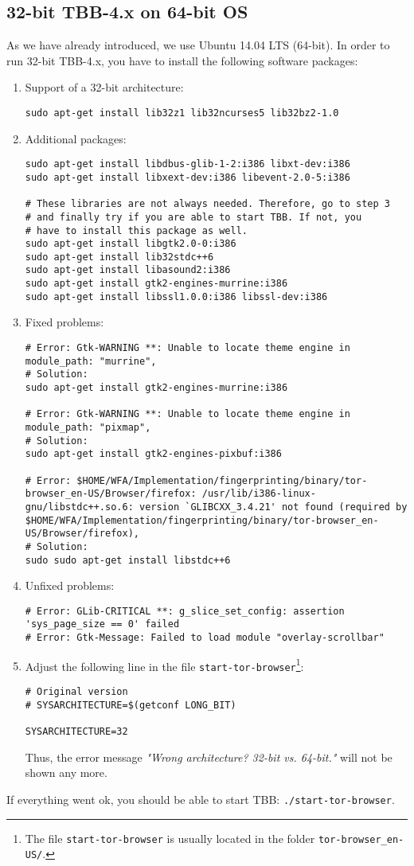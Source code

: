 \subsection{32-bit \ac{TBB}-4.x on 64-bit \ac{OS}}
\label{subsec:tbb_patch}

As we have already introduced, we use Ubuntu 14.04 LTS (64-bit). In order to run 32-bit \ac{TBB}-4.x, you have to install the following software packages:
\begin{enumerate}
\item Support of a 32-bit architecture:
\begin{verbatim}sudo apt-get install lib32z1 lib32ncurses5 lib32bz2-1.0\end{verbatim}
\item Additional packages:
\begin{verbatim}
sudo apt-get install libdbus-glib-1-2:i386 libxt-dev:i386
sudo apt-get install libxext-dev:i386 libevent-2.0-5:i386

# These libraries are not always needed. Therefore, go to step 3
# and finally try if you are able to start TBB. If not, you 
# have to install this package as well.
sudo apt-get install libgtk2.0-0:i386
sudo apt-get install lib32stdc++6
sudo apt-get install libasound2:i386
sudo apt-get install gtk2-engines-murrine:i386
sudo apt-get install libssl1.0.0:i386 libssl-dev:i386
\end{verbatim}
\item Fixed problems:
\begin{verbatim}
# Error: Gtk-WARNING **: Unable to locate theme engine in module_path: "murrine",
# Solution:
sudo apt-get install gtk2-engines-murrine:i386

# Error: Gtk-WARNING **: Unable to locate theme engine in module_path: "pixmap",
# Solution:
sudo apt-get install gtk2-engines-pixbuf:i386

# Error: $HOME/WFA/Implementation/fingerprinting/binary/tor-browser_en-US/Browser/firefox: /usr/lib/i386-linux-gnu/libstdc++.so.6: version `GLIBCXX_3.4.21' not found (required by $HOME/WFA/Implementation/fingerprinting/binary/tor-browser_en-US/Browser/firefox),
# Solution:
sudo sudo apt-get install libstdc++6
\end{verbatim}
\item Unfixed problems:
\begin{verbatim}
# Error: GLib-CRITICAL **: g_slice_set_config: assertion 'sys_page_size == 0' failed
# Error: Gtk-Message: Failed to load module "overlay-scrollbar"
\end{verbatim}


\item Adjust the following line in the file \texttt{start-tor-browser}\footnote{The file \texttt{start-tor-browser} is usually located in the folder \texttt{tor-browser\_en-US/}.}:
\begin{verbatim}
# Original version
# SYSARCHITECTURE=$(getconf LONG_BIT)

SYSARCHITECTURE=32
\end{verbatim}
Thus, the error message \emph{"Wrong architecture? 32-bit vs. 64-bit."} will not be shown any more.
\end{enumerate}
If everything went ok, you should be able to start \ac{TBB}: \texttt{./start-tor-browser}.

